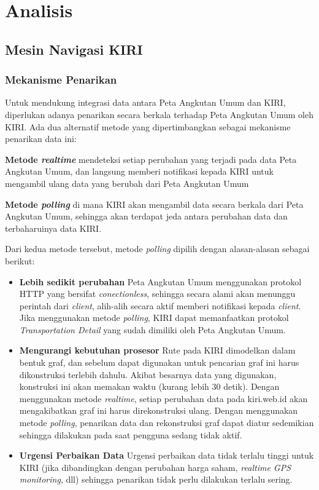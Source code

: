 \chapter{Analisis}

\section{Mesin Navigasi KIRI}

\subsection{Mekanisme Penarikan}

Untuk mendukung integrasi data antara Peta Angkutan Umum dan KIRI, diperlukan adanya penarikan secara berkala terhadap Peta Angkutan Umum oleh KIRI. Ada dua alternatif metode yang dipertimbangkan sebagai mekanisme penarikan data ini:

\begin{description}
	\item \textbf{Metode \textit{realtime}} mendeteksi setiap perubahan yang terjadi pada data Peta Angkutan Umum, dan langsung memberi notifikasi kepada KIRI untuk mengambil ulang data yang berubah dari Peta Angkutan Umum
	\item \textbf{Metode \textit{polling}} di mana KIRI akan mengambil data secara berkala dari Peta Angkutan Umum, sehingga akan terdapat jeda antara perubahan data dan terbaharuinya data KIRI.
\end{description}

Dari kedua metode tersebut, metode \textit{polling} dipilih dengan alasan-alasan sebagai berikut:

\begin{itemize}
	\item \textbf{Lebih sedikit perubahan} Peta Angkutan Umum menggunakan protokol HTTP yang bersifat \textit{conectionless}, sehingga secara alami akan menunggu perintah dari \textit{client}, alih-alih secara aktif memberi notifikasi kepada \textit{client}. Jika menggunakan metode \textit{polling}, KIRI dapat memanfaatkan protokol \textit{Transportation Detail} yang sudah dimiliki oleh Peta Angkutan Umum.
	\item \textbf{Mengurangi kebutuhan prosesor} Rute pada KIRI dimodelkan dalam bentuk graf, dan sebelum dapat digunakan untuk pencarian graf ini harus dikonstruksi terlebih dahulu. Akibat besarnya data yang digunakan, konstruksi ini akan memakan waktu (kurang lebih 30 detik). Dengan menggunakan metode \textit{realtime}, setiap perubahan data pada kiri.web.id akan mengakibatkan graf ini harus direkonstruksi ulang. Dengan menggunakan metode \textit{polling}, penarikan data dan rekonstruksi graf dapat diatur sedemikian sehingga dilakukan pada saat pengguna sedang tidak aktif.
	\item \textbf{Urgensi Perbaikan Data} Urgensi perbaikan data tidak terlalu tinggi untuk KIRI (jika dibandingkan dengan perubahan harga saham, \textit{realtime GPS monitoring}, dll) sehingga penarikan tidak perlu dilakukan terlalu sering.
\end{itemize}

